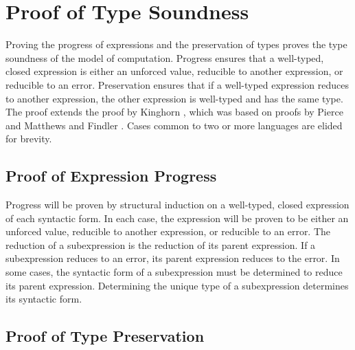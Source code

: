 \chapter{Proof of Type Soundness}


Proving the progress of expressions and the preservation of types proves the type soundness of the model of computation.  Progress ensures that a well-typed, closed expression is either an unforced value, reducible to another expression, or reducible to an error.  Preservation ensures that if a well-typed expression reduces to another expression, the other expression is well-typed and has the same type.  The proof extends the proof by Kinghorn \cite{kinghorn07}, which was based on proofs by Pierce \cite{pierce02} and Matthews and Findler \cite{matthews07}.  Cases common to two or more languages are elided for brevity.

\section{Proof of Expression Progress}

Progress will be proven by structural induction on a well-typed, closed expression of each syntactic form.  In each case, the expression will be proven to be either an unforced value, reducible to another expression, or reducible to an error.  The reduction of a subexpression is the reduction of its parent expression.  If a subexpression reduces to an error, its parent expression reduces to the error.  In some cases, the syntactic form of a subexpression must be determined to reduce its parent expression.  Determining the unique type of a subexpression determines its syntactic form.













\section{Proof of Type Preservation}

